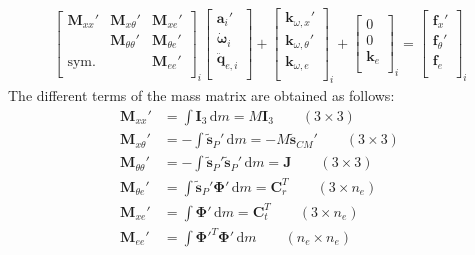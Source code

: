 \documentclass[wes, manuscript]{copernicus}
\renewcommand{\d}{\mathrm{d}}
\renewcommand{\v}[1]{\boldsymbol{#1}}
\newcommand{\m}[1]{\boldsymbol{#1}}
\newcommand{\M} {{\m{M}}}
\newcommand{\stil}  {\m{\tilde{s}}}
\renewcommand{\d}{\mathrm{d}}
\newcommand{\dm}{\d{m}}
\begin{document}
\begin{align}
    \begin{bmatrix}
       \M_{xx}'    & \M_{x \theta}' & \M_{ x e }' \\
                   & \M_{\theta \theta}'   & \M_{\theta e}'   \\
       \text{sym.} &            & \M_{e e}'  \\
    \end{bmatrix}_i
    \begin{bmatrix}
      \v{a}_i' \\
      \v{\dot{\omega}}_i \\
      \v{\ddot{q}}_{e,i} \\
    \end{bmatrix}
      +
    \begin{bmatrix}
      \v{k}_{\omega, x}' \\
      \v{k}_{\omega, \theta}' \\
      \v{k}_{\omega, e} \\
    \end{bmatrix}_i
      +
    \begin{bmatrix}
      0 \\
      0 \\
      \v{k}_{e}\\
    \end{bmatrix}_i
      =
    \begin{bmatrix}
      \v{f}_{x}' \\
      \v{f}_{\theta}' \\
      \v{f}_{e}\\
    \end{bmatrix}_i
    \label{eq:EOMFlexibleBodyRepeated}
\end{align}
The different terms of the mass matrix are obtained as follows:
\begin{align}
   \M_{xx}'           & =  \int \m{I}_3 \,\dm = M \m{I}_3  \qquad (3\times3)
       \\
   \M_{x\theta}'      & = -\int \stil_P' \,\dm          = -M \m{\tilde{s}}_{CM}'    \qquad (3\times3)
       \\
   \M_{\theta\theta}' & = -\int \stil_P' \stil_P' \,\dm = \v{J}   \qquad (3\times 3) 
   \\
   \M_{\theta e}'     & =  \int \stil_P' \m{\Phi}' \,\dm=\m{C}_r^T  \qquad (3\times n_e)
   \\
   \M_{x e}'          & =  \int \m{\Phi}' \,\dm =\m{C}_t^T  \qquad (3 \times n_e)
   \\
   \M_{e e}'          & =  \int {\m{\Phi}'}^T \m{\Phi}' \,\dm  \qquad (n_e \times n_e)
    \label{eq:MMFlexible}
\end{align}
\end{document}
